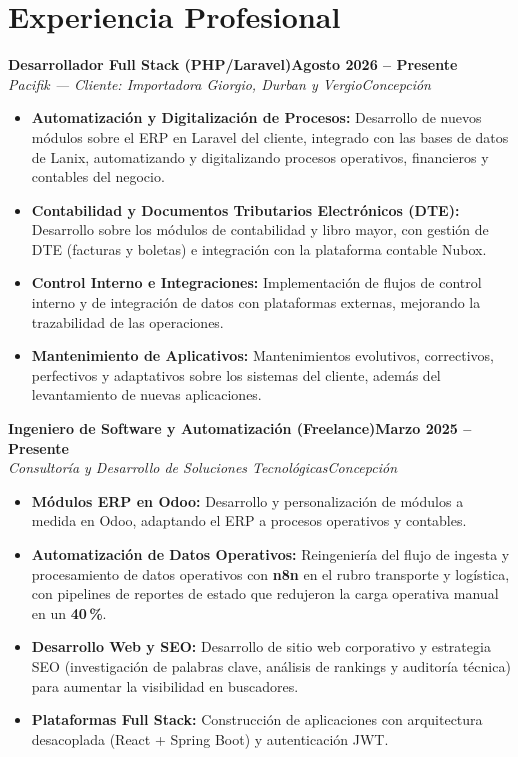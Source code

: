 \documentclass[10pt,a4paper]{article}
\newcommand{\cargo}[4]{\needspace{5\baselineskip}%
  \textbf{#1}\hfill\textbf{#2}\\
  \textit{#3}\hfill\textit{#4}\vspace{-2pt}}
\begin{document}
\section{Experiencia Profesional}

\cargo{Desarrollador Full Stack (PHP/Laravel)}{Agosto 2026 -- Presente}{Pacifik --- Cliente: Importadora Giorgio, Durban y Vergio}{Concepción}
\begin{itemize}
  \item \textbf{Automatización y Digitalización de Procesos:} Desarrollo de nuevos módulos sobre el ERP en Laravel del cliente, integrado con las bases de datos de Lanix, automatizando y digitalizando procesos operativos, financieros y contables del negocio.
  \item \textbf{Contabilidad y Documentos Tributarios Electrónicos (DTE):} Desarrollo sobre los módulos de contabilidad y libro mayor, con gestión de DTE (facturas y boletas) e integración con la plataforma contable Nubox.
  \item \textbf{Control Interno e Integraciones:} Implementación de flujos de control interno y de integración de datos con plataformas externas, mejorando la trazabilidad de las operaciones.
  \item \textbf{Mantenimiento de Aplicativos:} Mantenimientos evolutivos, correctivos, perfectivos y adaptativos sobre los sistemas del cliente, además del levantamiento de nuevas aplicaciones.
\end{itemize}

\vspace{4pt}
\cargo{Ingeniero de Software y Automatización (Freelance)}{Marzo 2025 -- Presente}{Consultoría y Desarrollo de Soluciones Tecnológicas}{Concepción}
\begin{itemize}
  \item \textbf{Módulos ERP en Odoo:} Desarrollo y personalización de módulos a medida en Odoo, adaptando el ERP a procesos operativos y contables.
  \item \textbf{Automatización de Datos Operativos:} Reingeniería del flujo de ingesta y procesamiento de datos operativos con \textbf{n8n} en el rubro transporte y logística, con pipelines de reportes de estado que redujeron la carga operativa manual en un \textbf{40\,\%}.
  \item \textbf{Desarrollo Web y SEO:} Desarrollo de sitio web corporativo y estrategia SEO (investigación de palabras clave, análisis de rankings y auditoría técnica) para aumentar la visibilidad en buscadores.
  \item \textbf{Plataformas Full Stack:} Construcción de aplicaciones con arquitectura desacoplada (React + Spring Boot) y autenticación JWT.
\end{itemize}
\end{document}
